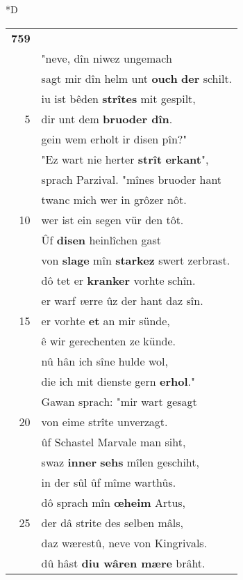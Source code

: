 \documentclass[8pt,a4paper,notitlepage]{article}
\begin{document}
\begin{table}[ht]
\begin{minipage}[t]{0.5\linewidth}
\small
\begin{center}*D
\end{center}
\begin{tabular}{rl}
\textbf{759} & \textit{\begin{large}G\end{large}}awan zuo Parzivale sprach:\\ 
 & "neve, dîn niwez ungemach\\ 
 & sagt mir dîn helm unt \textbf{ouch} \textbf{der} schilt.\\ 
 & iu ist bêden \textbf{strîtes} mit gespilt,\\ 
5 & dir unt dem \textbf{bruoder dîn}.\\ 
 & gein wem erholt ir disen pîn?"\\ 
 & "Ez wart nie herter \textbf{strît} \textbf{erkant}",\\ 
 & sprach Parzival. "mînes bruoder hant\\ 
 & twanc mich wer in grôzer nôt.\\ 
10 & wer ist ein segen vür den tôt.\\ 
 & Ûf \textbf{disen} heinlîchen gast\\ 
 & von \textbf{slage} mîn \textbf{starkez} swert zerbrast.\\ 
 & dô tet er \textbf{kranker} vorhte schîn.\\ 
 & er warf \textit{v}erre ûz der hant daz sîn.\\ 
15 & er vorhte \textbf{et} an mir sünde,\\ 
 & ê wir gerechenten ze künde.\\ 
 & nû hân ich sîne hulde wol,\\ 
 & die ich mit dienste gern \textbf{erhol}."\\ 
 & Gawan sprach: "mir wart gesagt\\ 
20 & von eime strîte unverzagt.\\ 
 & ûf Schastel Marvale man siht,\\ 
 & swaz \textbf{inner} \textbf{sehs} mîlen geschiht,\\ 
 & in der sûl ûf mîme warthûs.\\ 
 & dô sprach mîn \textbf{œheim} Artus,\\ 
25 & der dâ strite des selben mâls,\\ 
 & daz wærestû, neve von Kingrivals.\\ 
 & dû hâst \textbf{diu wâren mære} brâht.\\ 

\end{tabular}
\end{minipage}
\end{table}
\end{document}
